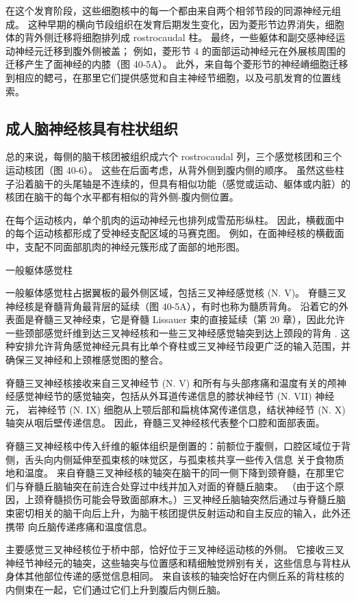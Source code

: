 在这个发育阶段，这些细胞核中的每一个都由来自两个相邻节段的同源神经元组成。 这种早期的横向节段组织在发育后期发生变化，因为菱形节边界消失，细胞体的背外侧迁移将细胞排列成 rostrocaudal 柱。 最终，一些躯体和副交感神经运动神经元迁移到腹外侧被盖； 例如，菱形节 4 的面部运动神经元在外展核周围的迁移产生了面神经的内膝（图 40-5A）。 此外，来自每个菱形节的神经嵴细胞迁移到相应的鳃弓，在那里它们提供感觉和自主神经节细胞，以及弓肌发育的位置线索。

\subsection{成人脑神经核具有柱状组织}
总的来说，每侧的脑干核团被组织成六个 rostrocaudal 列，三个感觉核团和三个运动核团（图 40-6）。 这些在后面考虑，从背外侧到腹内侧的顺序。 虽然这些柱子沿着脑干的头尾轴是不连续的，但具有相似功能（感觉或运动、躯体或内脏）的核团在脑干的每个水平都有相似的背外侧-腹内侧位置。

在每个运动核内，单个肌肉的运动神经元也排列成雪茄形纵柱。 因此，横截面中的每个运动核都形成了受神经支配区域的马赛克图。 例如，在面神经核的横截面中，支配不同面部肌肉的神经元簇形成了面部的地形图。

一般躯体感觉柱

一般躯体感觉柱占据翼板的最外侧区域，包括三叉神经感觉核 (N. V)。 脊髓三叉神经核是脊髓背角最背层的延续（图 40-5A），有时也称为髓质背角。 沿着它的外表面是脊髓三叉神经束，它是脊髓 Lissauer 束的直接延续（第 20 章），因此允许一些颈部感觉纤维到达三叉神经核和一些三叉神经感觉轴突到达上颈段的背角 . 这种安排允许背角感觉神经元具有比单个脊柱或三叉神经节段更广泛的输入范围，并确保三叉神经和上颈椎感觉图的整合。

脊髓三叉神经核接收来自三叉神经节 (N. V) 和所有与头部疼痛和温度有关的颅神经感觉神经节的感觉轴突，包括从外耳道传递信息的膝状神经节 (N. VII) 神经元， 岩神经节 (N. IX) 细胞从上颚后部和扁桃体窝传递信息，结状神经节 (N. X) 轴突从咽后壁传递信息。 因此，脊髓三叉神经核代表整个口腔和面部表面。

脊髓三叉神经核中传入纤维的躯体组织是倒置的：前额位于腹侧，口腔区域位于背侧，舌头向内侧延伸至孤束核的味觉区，与孤束核共享一些传入信息 关于食物质地和温度。 来自脊髓三叉神经核的轴突在脑干的同一侧下降到颈脊髓，在那里它们与脊髓丘脑轴突在前连合处穿过中线并加入对面的脊髓丘脑束。 （由于这个原因，上颈脊髓损伤可能会导致面部麻木。）三叉神经丘脑轴突然后通过与脊髓丘脑束密切相关的脑干向后上升，为脑干核团提供反射运动和自主反应的输入，此外还携带 向丘脑传递疼痛和温度信息。

主要感觉三叉神经核位于桥中部，恰好位于三叉神经运动核的外侧。 它接收三叉神经节神经元的轴突，这些轴突与位置感和精细触觉辨别有关，这些信息与背柱从身体其他部位传递的感觉信息相同。 来自该核的轴突恰好在内侧丘系的背柱核的内侧束在一起，它们通过它们上升到腹后内侧丘脑。

